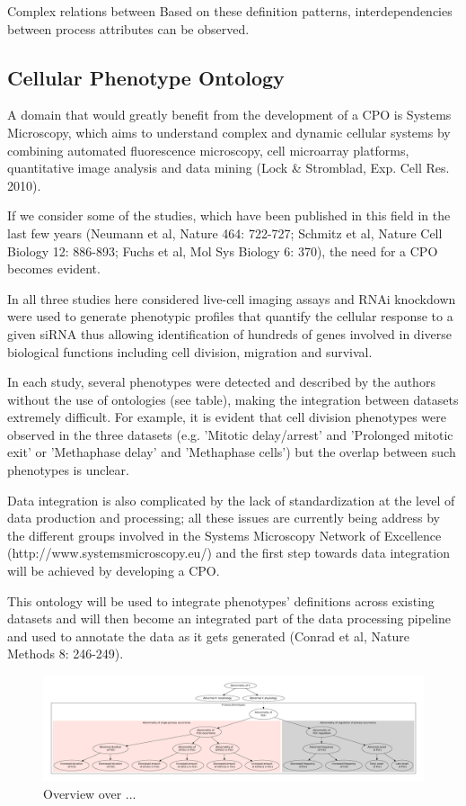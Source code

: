 \documentclass{bioinfo}
\begin{document}
Complex relations between Based on these definition patterns,
interdependencies between process attributes can be observed.


\subsection{Cellular Phenotype Ontology}

A domain that would greatly benefit from the development of a CPO is
Systems Microscopy, which aims to understand complex and dynamic
cellular systems by combining automated fluorescence microscopy, cell
microarray platforms, quantitative image analysis and data mining
(Lock \& Stromblad, Exp. Cell Res. 2010).

If we consider some of the studies, which have been published in this
field in the last few years (Neumann et al, Nature 464: 722-727;
Schmitz et al, Nature Cell Biology 12: 886-893; Fuchs et al, Mol Sys
Biology 6: 370), the need for a CPO becomes evident.

In all three studies here considered live-cell imaging assays and RNAi
knockdown were used to generate phenotypic profiles that quantify the
cellular response to a given siRNA thus allowing identification of
hundreds of genes involved in diverse biological functions including
cell division, migration and survival.

In each study, several phenotypes were detected and described by the
authors without the use of ontologies (see table), making the
integration between datasets extremely difficult. For example, it is
evident that cell division phenotypes were observed in the three
datasets (e.g. 'Mitotic delay/arrest' and 'Prolonged mitotic exit' or
'Methaphase delay' and 'Methaphase cells') but the overlap between
such phenotypes is unclear.

Data integration is also complicated by the lack of standardization at
the level of data production and processing; all these issues are
currently being address by the different groups involved in the
Systems Microscopy Network of Excellence
(http://www.systemsmicroscopy.eu/) and the first step towards data
integration will be achieved by developing a CPO.

This ontology will be used to integrate phenotypes' definitions across
existing datasets and will then become an integrated part of the data
processing pipeline and used to annotate the data as it gets generated
(Conrad et al, Nature Methods 8: 246-249).

\begin{figure}[h]
  \centering
  \includegraphics[width=\textwidth,
  height=.33\textheight]{overview.pdf}
  \caption{Overview over ...\label{fig:overview}}
\end{figure}
\end{document}
